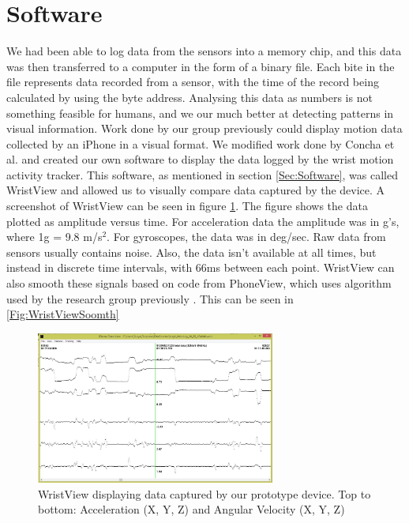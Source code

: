 \section{Software}
\label{Sec:ResultsSoftware}
We had been able to log data from the sensors into a memory chip,
and this data was then transferred to a computer in the form of a binary file.
Each bite in the file represents data recorded from a sensor,
with the time of the record being calculated by using the byte address.
Analysing this data as numbers is not something feasible for humans,
and we our much better at detecting patterns in visual information.
Work done by our group previously could display motion data collected by an iPhone in a visual format.
We modified work done by Concha et al. \cite{concha2014study} and created our own software to display the data logged by the wrist motion activity tracker.
This software, as mentioned in section \ref{Sec:Software},
was called WristView and allowed us to visually compare data captured by the device.
A screenshot of WristView can be seen in figure \ref{Fig:WristView}.
The figure shows the data plotted as amplitude versus time.
For acceleration data the amplitude was in g's, where 1g = 9.8 m/s$^2$. For gyroscopes, the data was in deg/sec.
Raw data from sensors usually contains noise.
Also, the data isn't available at all times,
but instead in discrete time intervals, with 66ms between each point.
WristView can also smooth these signals based on code from PhoneView, which uses algorithm used by the research group previously \cite{}. This can be seen in \ref{Fig:WristViewSoomth}
\begin{figure}
\begin{center}
\includegraphics[width=0.7\textwidth]{images/WristView.jpg}
\caption{WristView displaying data captured by our prototype device. Top to bottom: Acceleration (X, Y, Z) and Angular Velocity (X, Y, Z)}
\label{Fig:WristView}
\end{center}
\end{figure}
